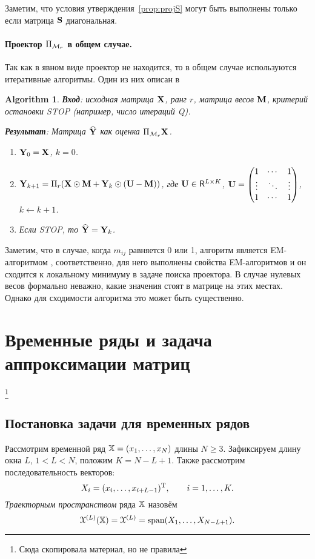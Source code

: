\documentclass[12pt,a4paper,fleqn,leqno]{article}
\newtheorem{algorithm}{Algorithm}%
\begin{document}
\begin{remark}
Заметим, что условия утверждения~\ref{prop:projS} могут быть выполнены только если матрица $\mathbf{S}$ диагональная.
\end{remark}

\paragraph{Проектор $\Pi_{\mathcal{M}_r}$ в общем случае.}
Так как в явном виде проектор не находится, то в общем случае используются итеративные алгоритмы.
Один из них описан в \cite{Srebro2003}

\begin{algorithm}
\label{alg:weightedSVD}
\textbf{Вход}: исходная матрица $\mathbf{X}$, ранг $r$, матрица весов $\mathbf{M}$,
критерий остановки STOP (например, число итераций Q).

\textbf{Результат}:
Матрица $\widehat{\mathbf{Y}}$ как оценка $\Pi_{\mathcal{M}_r} \mathbf{X}$.

\begin{enumerate}
\item
$\mathbf{Y}_0 = \mathbf{X}$, $k=0$.
\item
$\mathbf{Y}_{k+1} = \Pi_r(\mathbf{X} \odot \mathbf{M} + \mathbf{Y}_{k} \odot (\mathbf{U} -  \mathbf{M}))$, где
$\mathbf{U} \in \mathsf{R}^{L \times K}$,  $\mathbf{U} = \begin{pmatrix}
1 & \cdots & 1 \\
\vdots & \ddots & \vdots \\
1 & \cdots & 1
\end{pmatrix}$, $k\leftarrow k+1$.
\item
Если STOP, то $\widehat{\mathbf{Y}} = \mathbf{Y}_k$.
\end{enumerate}
\end{algorithm}

Заметим, что в случае, когда $m_{ij}$ равняется 0 или 1, алгоритм является EM-алгоритмом \cite{Srebro2003},
соответственно, для него выполнены свойства EM-алгоритмов и он сходится к локальному минимуму в задаче поиска проектора.
В случае нулевых весов формально неважно, какие значения стоят в матрице на этих местах. Однако для сходимости алгоритма
это может быть существенно.

\section{Временные ряды и задача аппроксимации матриц}
\footnote{Сюда скопировала материал, но не правила}
\subsection{Постановка задачи для временных рядов}
Рассмотрим временной ряд $\mathbb{X} = (x_1, \ldots, x_N)$ длины $N \ge 3$. Зафиксируем длину окна $L$, $1 < L < N$, положим $K = N - L + 1$. Также рассмотрим последовательность векторов:
\begin{equation}\label{l_lagged}
X_i = (x_i, \ldots, x_{i + L - 1})^{\mathrm{T}}, \qquad i = 1, \ldots, K.
\end{equation}
\emph{Траекторным пространством} ряда $\mathbb{X}$ назовём $$\EuScript{X}^{(L)}(\mathbb{X}) = \EuScript{X}^{(L)} = \text{span}(X_1, \ldots, X_{N-L+1}).$$
\end{document}
